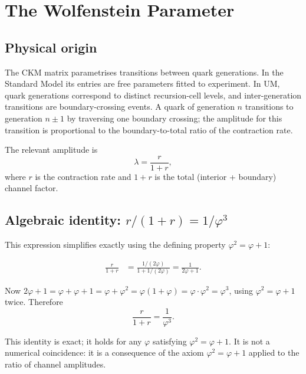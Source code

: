 \documentclass[12pt]{article}
\begin{document}
\section{The Wolfenstein Parameter}

\subsection{Physical origin}

The CKM matrix parametrises transitions between quark generations. In the
Standard Model its entries are free parameters fitted to experiment. In UM,
quark generations correspond to distinct recursion-cell levels, and
inter-generation transitions are boundary-crossing events. A quark of
generation $n$ transitions to generation $n \pm 1$ by traversing one
boundary crossing; the amplitude for this transition is proportional to the
boundary-to-total ratio of the contraction rate.

The relevant amplitude is
\begin{equation}
  \lambda = \frac{r}{1 + r},
  \label{eq:lambda_raw}
\end{equation}
where $r$ is the contraction rate and $1 + r$ is the total (interior +
boundary) channel factor.

\subsection{Algebraic identity: $r/(1+r) = 1/\varphi^3$}

This expression simplifies exactly using the defining property
$\varphi^2 = \varphi + 1$:

\begin{align}
  \frac{r}{1+r}
  &= \frac{1/(2\varphi)}{1 + 1/(2\varphi)}
   = \frac{1}{2\varphi + 1}. \label{eq:id1}
\end{align}

Now $2\varphi + 1 = \varphi + \varphi + 1 = \varphi + \varphi^2 =
\varphi(1 + \varphi) = \varphi \cdot \varphi^2 = \varphi^3$, using
$\varphi^2 = \varphi + 1$ twice. Therefore
\begin{equation}
  \boxed{\frac{r}{1+r} = \frac{1}{\varphi^3}}.
  \label{eq:id}
\end{equation}

This identity is exact; it holds for any $\varphi$ satisfying $\varphi^2 =
\varphi + 1$. It is not a numerical coincidence: it is a consequence of the
axiom $\varphi^2 = \varphi + 1$ applied to the ratio of channel amplitudes.
\end{document}
